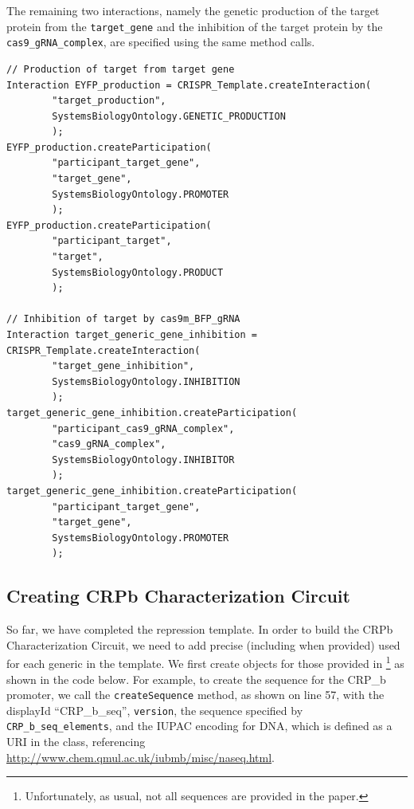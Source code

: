 The remaining two interactions, namely the genetic production of the target protein from the \lstinline+target_gene+ and the inhibition of the target protein by the \lstinline+cas9_gRNA_complex+, are specified using the same method calls.

\vspace{\abovedisplayskip}
\begin{minipage}{0.95\textwidth}%
\begin{lstlisting}
// Production of target from target gene
Interaction EYFP_production = CRISPR_Template.createInteraction(
        "target_production", 
        SystemsBiologyOntology.GENETIC_PRODUCTION
        );
EYFP_production.createParticipation(
        "participant_target_gene", 
        "target_gene",
        SystemsBiologyOntology.PROMOTER
        );
EYFP_production.createParticipation(
        "participant_target", 
        "target",
        SystemsBiologyOntology.PRODUCT
        );
	
// Inhibition of target by cas9m_BFP_gRNA 
Interaction target_generic_gene_inhibition = CRISPR_Template.createInteraction(
        "target_gene_inhibition", 
        SystemsBiologyOntology.INHIBITION
        );
target_generic_gene_inhibition.createParticipation(
        "participant_cas9_gRNA_complex", 
        "cas9_gRNA_complex",
        SystemsBiologyOntology.INHIBITOR
        );
target_generic_gene_inhibition.createParticipation(
        "participant_target_gene", 
        "target_gene",
        SystemsBiologyOntology.PROMOTER
        );
\end{lstlisting}
\end{minipage}

\subsection*{Creating CRPb Characterization Circuit}
So far, we have completed the repression template. In order to build the CRPb Characterization Circuit, we need to add precise (including  when provided)  used for each generic  in the template. We first create  objects for those provided in \cite{kiani2014crispr}\footnote{Unfortunately, as usual, not all sequences are provided in the paper.} as shown in the code below. For example, to create the sequence for the CRP\_b promoter, we call the \lstinline+createSequence+ method, as shown on line 57, with the displayId ``CRP\_b\_seq'', \lstinline+version+, the sequence specified by \lstinline+CRP_b_seq_elements+, and the IUPAC encoding for DNA, which is defined as a URI in the  class, referencing \url{http://www.chem.qmul.ac.uk/iubmb/misc/naseq.html}.

